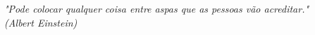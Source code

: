\begin{epigrafe}
\vspace*{\fill}
\begin{flushright}
\textit{"Pode colocar qualquer coisa entre aspas que as pessoas vão acreditar." \\
(Albert Einstein)}
\end{flushright}
\end{epigrafe}